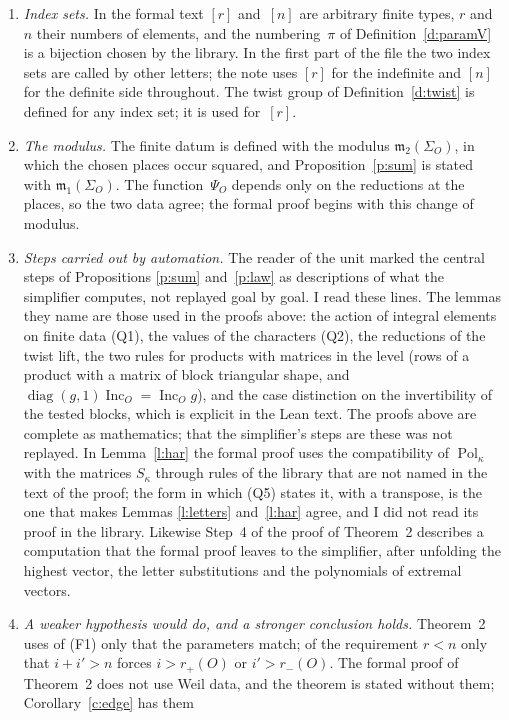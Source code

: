 \documentclass[11pt,a4paper]{article}
\newcommand{\m}[1]{\mbox{$#1$}}        %
\theoremstyle{plainx}
\theoremstyle{uprightx}
\newcommand{\rmi}[1]{r_{-}(#1)}
\newcommand{\rpl}[1]{r_{+}(#1)}
\newcommand{\IncM}[1]{\operatorname{Inc}_{#1}}
\newcommand{\SigO}[1]{\Sigma_{#1}}
\newcommand{\Pol}[1]{\operatorname{Pol}_{#1}}
\newcommand{\Sch}[1]{S_{#1}}
\newcommand{\lmod}[2]{\mathfrak{m}_{#2}(#1)}
\begin{document}
\begin{enumerate}[label=\textup{\arabic*.},leftmargin=1.6em,itemsep=5pt]
still to be made.
\item \emph{Index sets.} In the formal text $[r]$ and~$[n]$ are arbitrary finite types, $r$ and~$n$ their numbers
of elements, and the numbering~$\pi$ of Definition~\ref{d:paramV} is a bijection chosen by the library. In the
first part of the file the two index sets are called by other letters; the note uses $[r]$ for the indefinite
and $[n]$ for the definite side throughout. The twist group of Definition~\ref{d:twist} is defined for any index
set; it is used for~$[r]$.
\item \emph{The modulus.} The finite datum is defined with the modulus \m{\lmod{\SigO{O}}{2}}, in which the chosen
places occur squared, and Proposition~\ref{p:sum} is stated with \m{\lmod{\SigO{O}}{1}}. The function~$\Psi_{O}$
depends only on the reductions at the places, so the two data agree; the formal proof begins with this change
of modulus.
\item \emph{Steps carried out by automation.} The reader of the unit marked the central steps of
Propositions \ref{p:sum} and~\ref{p:law} as descriptions of what the simplifier computes, not replayed goal by
goal. I read these lines. The lemmas they name are those used in the proofs above: the action of integral
elements on finite data (Q1), the values of the characters (Q2), the reductions of the twist lift, the two
rules for products with matrices in the level (rows of a product with a matrix of block triangular shape, and
\m{\operatorname{diag}(g,1)\IncM{O}=\IncM{O}g}), and the case distinction on the invertibility of the tested blocks,
which is explicit in the Lean text. The proofs above are complete as mathematics; that the simplifier's steps
are these was not replayed. In Lemma~\ref{l:har} the formal proof uses the compatibility of \m{\Pol{\kappa}} with the
matrices \m{\Sch{\kappa}} through rules of the library that are not named in the text of the proof; the form in
which (Q5) states it, with a transpose, is the one that makes Lemmas \ref{l:letters} and~\ref{l:har} agree, and I
did not read its proof in the library. Likewise Step~4 of the proof of Theorem~2 describes a computation that
the formal proof leaves to the simplifier, after unfolding the highest vector, the letter substitutions and the
polynomials of extremal vectors.
\item \emph{A weaker hypothesis would do, and a stronger conclusion holds.} Theorem~2 uses of (F1) only that the
parameters match; of the requirement \m{r<n} only that \m{i+i'>n} forces \m{i>\rpl{O}} or \m{i'>\rmi{O}}. The formal
proof of Theorem~2 does not use Weil data, and the theorem is stated without them; Corollary~\ref{c:edge} has them

\end{enumerate}
\end{document}
